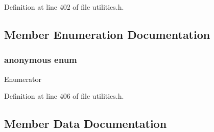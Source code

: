 Definition at line 402 of file utilities.\+h.



\subsection{Member Enumeration Documentation}
\hypertarget{structcrap_1_1limits_3_01uint32__t_01_4_ae0618ee6869754870fb5e09d38a075bb}{}\subsubsection[{anonymous enum}]{\setlength{\rightskip}{0pt plus 5cm}anonymous enum}\label{structcrap_1_1limits_3_01uint32__t_01_4_ae0618ee6869754870fb5e09d38a075bb}
\begin{Desc}
\item[Enumerator]\par
\begin{description}
\item[{\em 
\hypertarget{structcrap_1_1limits_3_01uint32__t_01_4_ae0618ee6869754870fb5e09d38a075bbae37365109df12c47c29718b0457c5391}{}I\+S\+\_\+\+I\+N\+T\label{structcrap_1_1limits_3_01uint32__t_01_4_ae0618ee6869754870fb5e09d38a075bbae37365109df12c47c29718b0457c5391}
}]\item[{\em 
\hypertarget{structcrap_1_1limits_3_01uint32__t_01_4_ae0618ee6869754870fb5e09d38a075bbac5ac433b9bad88ee8817b137e32bcb17}{}I\+S\+\_\+\+S\+I\+G\+N\+E\+D\label{structcrap_1_1limits_3_01uint32__t_01_4_ae0618ee6869754870fb5e09d38a075bbac5ac433b9bad88ee8817b137e32bcb17}
}]\end{description}
\end{Desc}


Definition at line 406 of file utilities.\+h.



\subsection{Member Data Documentation}
\hypertarget{structcrap_1_1limits_3_01uint32__t_01_4_aea5412ff2c53d31f208c1f716de7ce63}{}

